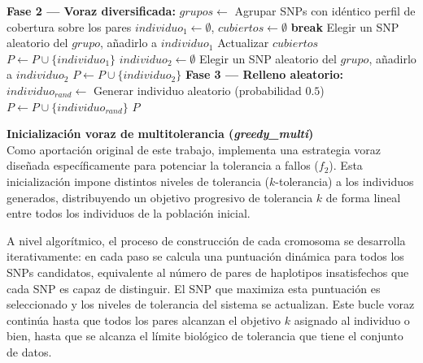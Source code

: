 \addtocounter{algorithm}{-1}
\begin{algorithm}[H]
\caption{Inicialización híbrida de Ting (\textit{greedy\_ting}) (Parte 2)}
\begin{algorithmic}[1]
\State \textbf{Fase 2 --- Voraz diversificada:}
\State $grupos \gets$ Agrupar SNPs con idéntico perfil de cobertura sobre los pares 
 
    \State $individuo_1 \gets \emptyset$, $cubiertos \gets \emptyset$ 
         \textbf{break} \EndIf
        \State Elegir un SNP aleatorio del $grupo$, añadirlo a $individuo_1$
        \State Actualizar $cubiertos$
    \EndFor
    \State $P \gets P \cup \{individuo_1\}$
     
        \State $individuo_2 \gets \emptyset$ 
            \State Elegir un SNP aleatorio del $grupo$, añadirlo a $individuo_2$
        \EndFor
        \State $P \gets P \cup \{individuo_2\}$
    \EndIf
\EndWhile
\State 
\State \textbf{Fase 3 --- Relleno aleatorio:}
 
    \State $individuo_{rand} \gets$ Generar individuo aleatorio (probabilidad $0.5$)
    \State $P \gets P \cup \{individuo_{rand}\}$
\EndWhile
\State \Return $P$
\end{algorithmic}
\end{algorithm}


\textbf{Inicialización voraz de multitolerancia (\textit{greedy\_multi})} \\
Como aportación original de este trabajo, implementa una estrategia voraz diseñada específicamente para potenciar la tolerancia a fallos ($f_2$). Esta inicialización impone distintos niveles de tolerancia ($k$-tolerancia) a los individuos generados, distribuyendo un objetivo progresivo de tolerancia $k$ de forma lineal entre todos los individuos de la población inicial. 

A nivel algorítmico, el proceso de construcción de cada cromosoma se desarrolla iterativamente: en cada paso se calcula una puntuación dinámica para todos los SNPs candidatos, equivalente al número de pares de haplotipos insatisfechos que cada SNP es capaz de distinguir. El SNP que maximiza esta puntuación es seleccionado y los niveles de tolerancia del sistema se actualizan. Este bucle voraz continúa hasta que todos los pares alcanzan el objetivo $k$ asignado al individuo o bien, hasta que se alcanza el límite biológico de tolerancia que tiene el conjunto de datos. 

